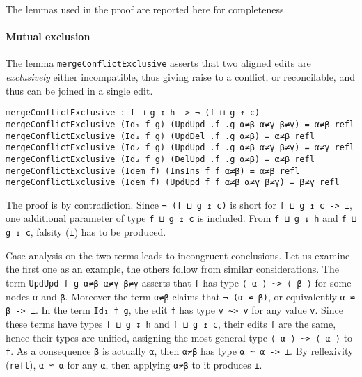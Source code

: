 \documentclass[../Thesis.tex]{subfiles}
\begin{document}
	The lemmas used in the proof are reported here for completeness.

	\paragraph{Mutual exclusion}
	\label{par:MutualExclusion}
	The lemma \texttt{mergeConflictExclusive} asserts that two aligned edits
	are \emph{exclusively} either incompatible, 
	thus giving raise to a conflict, or 
	reconcilable, and thus can be joined in a single edit. 

\begin{verbatim}
mergeConflictExclusive : f ⊔ g ↧ h -> ¬ (f ⊔ g ↥ c)
mergeConflictExclusive (Id₁ f g) (UpdUpd .f .g α≠β α≠γ β≠γ) = α≠β refl
mergeConflictExclusive (Id₁ f g) (UpdDel .f .g α≠β) = α≠β refl
mergeConflictExclusive (Id₂ f g) (UpdUpd .f .g α≠β α≠γ β≠γ) = α≠γ refl
mergeConflictExclusive (Id₂ f g) (DelUpd .f .g α≠β) = α≠β refl
mergeConflictExclusive (Idem f) (InsIns f f α≠β) = α≠β refl
mergeConflictExclusive (Idem f) (UpdUpd f f α≠β α≠γ β≠γ) = β≠γ refl
	\end{verbatim}
	
	The proof is by contradiction.
	Since \texttt{¬ (f ⊔ g ↥ c)} is short for \texttt{f ⊔ g ↥ c -> ⊥},
	one additional parameter of type \texttt{f ⊔ g ↥ c} is included.
	From \texttt{f ⊔ g ↧ h} and \texttt{f ⊔ g ↥ c}, falsity (\texttt{⊥})
	has to be produced. 
	
	Case analysis on the two terms leads to incongruent conclusions.
	Let us examine the first one as an example, the others follow from 
	similar considerations.
	The term \texttt{UpdUpd f g α≠β α≠γ β≠γ} asserts that 
	\texttt{f} has type \texttt{⟨ α ⟩ \textasciitilde> ⟨ β ⟩} for some 
	nodes \texttt{α} and \texttt{β}. Moreover the term
	\texttt{α≠β} claims that \texttt{¬ (α ⋍ β)}, or equivalently
	\texttt{α ⋍ β -> ⊥}.
	In the term \texttt{Id₁ f g}, the edit \texttt{f} 
	has type \texttt{v \textasciitilde> v} for any value \texttt{v}. Since these 
	terms have types	\texttt{f ⊔ g ↧ h} and \texttt{f ⊔ g ↥ c}, their edits 
	\texttt{f} are the same, hence their types are unified, assigning the most 
	general type \texttt{⟨ α ⟩ \textasciitilde> ⟨ α ⟩} to \texttt{f}.
	As a consequence \texttt{β} is actually \texttt{α}, then \texttt{α≠β}
	has type \texttt{α ⋍ α -> ⊥}. By reflexivity (\texttt{refl}), \texttt{α ⋍ α} for
	any \texttt{α}, then applying \texttt{α≠β} to it produces \texttt{⊥}.
	
\end{document}
